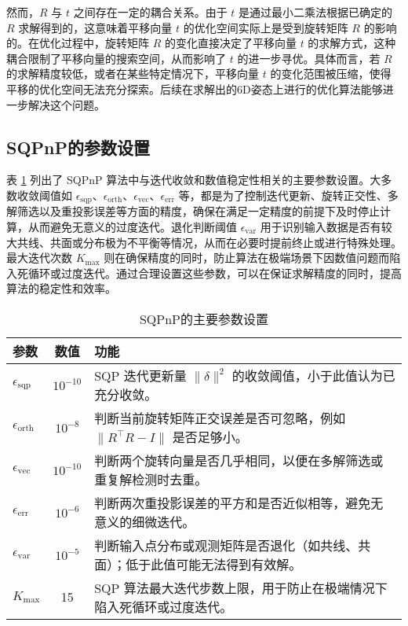 然而，$R$ 与 $t$ 之间存在一定的耦合关系。由于 $t$ 是通过最小二乘法根据已确定的 $R$ 求解得到的，这意味着平移向量 $t$ 的优化空间实际上是受到旋转矩阵 $R$ 的影响的。在优化过程中，旋转矩阵 $R$ 的变化直接决定了平移向量 $t$ 的求解方式，这种耦合限制了平移向量的搜索空间，从而影响了 $t$ 的进一步寻优。具体而言，若 $R$ 的求解精度较低，或者在某些特定情况下，平移向量 $t$ 的变化范围被压缩，使得平移的优化空间无法充分探索。后续在求解出的6D姿态上进行的优化算法能够进一步解决这个问题。
\subsection{SQPnP的参数设置}
表 \ref{tab:sqpnp-params} 列出了 SQPnP 算法中与迭代收敛和数值稳定性相关的主要参数设置。大多数收敛阈值如 \(\epsilon_{\mathrm{sqp}}\)、\(\epsilon_{\mathrm{orth}}\)、\(\epsilon_{\mathrm{vec}}\)、\(\epsilon_{\mathrm{err}}\) 等，都是为了控制迭代更新、旋转正交性、多解筛选以及重投影误差等方面的精度，确保在满足一定精度的前提下及时停止计算，从而避免无意义的过度迭代。退化判断阈值 \(\epsilon_{\mathrm{var}}\) 用于识别输入数据是否有较大共线、共面或分布极为不平衡等情况，从而在必要时提前终止或进行特殊处理。最大迭代次数 \(K_{\mathrm{max}}\) 则在确保精度的同时，防止算法在极端场景下因数值问题而陷入死循环或过度迭代。通过合理设置这些参数，可以在保证求解精度的同时，提高算法的稳定性和效率。
\begin{table}[htbp]
	\centering
	\caption{SQPnP的主要参数设置}
	\label{tab:sqpnp-params}
	\begin{tabular}{l c p{7.5cm}}
		\toprule
		\textbf{参数} & \textbf{数值} & \textbf{功能} \\
		\midrule
		
		$\epsilon_{\mathrm{sqp}}$      & $10^{-10}$ & 
		SQP 迭代更新量 $\|\delta\|^2$ 的收敛阈值，小于此值认为已充分收敛。\\[3pt]
		
		$\epsilon_{\mathrm{orth}}$     & $10^{-8}$  & 
		判断当前旋转矩阵正交误差是否可忽略，例如 $\|R^\top R - I\|$ 是否足够小。\\[3pt]
		
		$\epsilon_{\mathrm{vec}}$      & $10^{-10}$ &
		判断两个旋转向量是否几乎相同，以便在多解筛选或重复解检测时去重。\\[3pt]
		
		$\epsilon_{\mathrm{err}}$      & $10^{-6}$  &
		判断两次重投影误差的平方和是否近似相等，避免无意义的细微迭代。\\[3pt]
		
		$\epsilon_{\mathrm{var}}$      & $10^{-5}$  &
		判断输入点分布或观测矩阵是否退化（如共线、共面）；低于此值可能无法得到有效解。\\[3pt]
		
		$K_{\mathrm{max}}$             & 15         &
		SQP 算法最大迭代步数上限，用于防止在极端情况下陷入死循环或过度迭代。\\
		\bottomrule
	\end{tabular}
\end{table}
